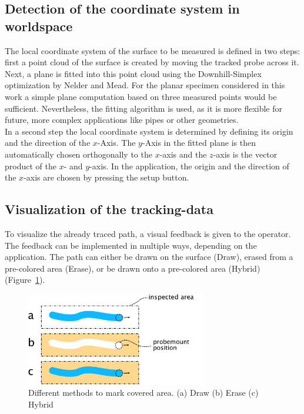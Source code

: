 \documentclass{VRARWorkshop}
\begin{document}
\subsection{Detection of the coordinate system in worldspace}
The local coordinate system of the surface to be measured is defined in two steps:
first a point cloud of the surface is created by moving the tracked probe across it.
Next, a plane is fitted into this point cloud using the Downhill-Simplex optimization by Nelder and Mead.
For the planar specimen considered in this work a simple plane computation based on three measured points would be sufficient.
Nevertheless, the fitting algorithm is used, as it is more flexible for future, more complex applications like pipes or other geometries.\\
In a second step the local coordinate system is determined by defining its origin and the direction of the $x$-Axis.
The $y$-Axis in the fitted plane is then automatically chosen orthogonally to the $x$-axis and the $z$-axis is the vector product of the $x$- and $y$-axis.
In the application, the origin and the direction of the $x$-axis are chosen by pressing the setup button.


\subsection{Visualization of the tracking-data}
\label{sec:DrawVsErase}
To visualize the already traced path, a visual feedback is given to the operator.
The feedback can be implemented in multiple ways, depending on the application.
The path can either be drawn on the surface ({\sc Draw}), erased from a pre-colored area ({\sc Erase}), or be drawn onto a pre-colored area ({\sc Hybrid}) (Figure~\ref{fig:DrawVsErase}).

\begin{figure}[h!]
    \begin{center}
        \includegraphics[width=79mm]{images/DrawVsErase}
        \caption{\label{fig:DrawVsErase} Different methods to mark covered area. (a) {\sc Draw} (b) {\sc Erase} (c) {\sc Hybrid}}
    \end{center}
\end{figure}
\end{document}

